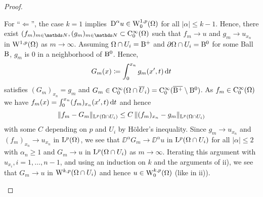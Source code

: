 \begin{proof}
\begin{enumerate}[i)]
        For ``$\Leftarrow$'', the case $k = 1$ implies $\,{\operatorname{D}}^\alpha u \in \mathrm{W}_0^{1,p}(\Omega)$ for all $|\alpha| \leq k - 1$.
        Hence, there exist $(f_m)_{m \in \N}, (g_m)_{m \in \N} \subset \CC_0^\infty(\Omega)$ such that $f_m \to u$ and $g_m \to u_{x_n}$ in $\mathrm{W}^{1,p}(\Omega)$ as $m \to \infty$.
        Assuming $\Omega \cap U_i = \mathrm{B}^+$ and $\partial \Omega \cap U_i = \mathrm{B}^0$ for some Ball $\mathrm{B}$, $g_m$ is $0$ in a neighborhood of $\mathrm{B}^0$.
        Hence, 
        $$
        G_m(x) \coloneqq \int_0^{x_n} g_m(x',t) \, {\operatorname{d}\!{t}}
        $$
        satisfies $(G_m)_{x_n} = g_m$ and $G_m \in \mathrm{C}_0^\infty(\Omega \cap \overline U_i) = \mathrm{C}_0^\infty(\overline{\mathrm{B}^+}\setminus \mathrm{B}^0)$.
        As $f_m \in \mathrm{C}_0^\infty(\Omega)$ we have $f_m (x) = \int_0^{x_n} (f_m)_{x_n}(x', t) \, {\operatorname{d}\!{t}}$ and hence
        $$
        \|f_m - G_m\|_{\mathrm{L}^p(\Omega \cap U_i)} \leq C \, \|(f_m)_{x_n} - g_m \|_{\mathrm{L}^p(\Omega \cap U_i)}
        $$
        with some $C$ depending on $p$ and $U_i$ by Hölder's inequality.
        Since $g_m \to u_{x_n}$ and $(f_m)_{x_n} \to u_{x_n}$ in $\mathrm{L}^p(\Omega)$, we see that $\DD^\alpha G_m \to \DD^\alpha u$ in $\mathrm{L}^p(\Omega \cap U_i)$ for all $|\alpha|\leq 2$ with $\alpha_n \geq 1$ and $G_m \to u$ in $\mathrm{L}^p(\Omega \cap U_i)$ as $m \to \infty$.
        Iterating this argument with $u_{x_i}, i = 1,\dots, n - 1$, and using an induction on $k$ and the arguments of ii), we see that $G_m \to u$ in $\mathrm{W}^{k,p}(\Omega \cap U_i)$ and hence $u \in \mathrm{W}_0^{k,p}(\Omega)$ (like in ii)). \qedhere
  \end{enumerate}
\end{proof}
